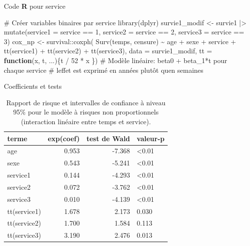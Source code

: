 \documentclass[
  ignorenonframetext,
]{beamer}
\newenvironment{Shaded}{\begin{snugshade}}{\end{snugshade}}
\newcommand{\AttributeTok}[1]{\textcolor[rgb]{0.40,0.45,0.13}{#1}}
\newcommand{\CommentTok}[1]{\textcolor[rgb]{0.37,0.37,0.37}{#1}}
\newcommand{\ControlFlowTok}[1]{\textcolor[rgb]{0.00,0.23,0.31}{\textbf{#1}}}
\newcommand{\DecValTok}[1]{\textcolor[rgb]{0.68,0.00,0.00}{#1}}
\newcommand{\FunctionTok}[1]{\textcolor[rgb]{0.28,0.35,0.67}{#1}}
\newcommand{\NormalTok}[1]{\textcolor[rgb]{0.00,0.23,0.31}{#1}}
\newcommand{\OtherTok}[1]{\textcolor[rgb]{0.00,0.23,0.31}{#1}}
\newcommand{\SpecialCharTok}[1]{\textcolor[rgb]{0.37,0.37,0.37}{#1}}
\begin{document}
\begin{frame}[fragile]{Code \textbf{R} pour service}
\protect{}\label{code-r-pour-service}
\begin{Shaded}
\begin{Highlighting}[numbers=left,,]
\CommentTok{\# Créer variables binaires par service}
\FunctionTok{library}\NormalTok{(dplyr)}
\NormalTok{survie1\_modif }\OtherTok{\textless{}{-}}\NormalTok{ survie1 }\SpecialCharTok{|\textgreater{}}
  \FunctionTok{mutate}\NormalTok{(}\AttributeTok{service1 =}\NormalTok{ service }\SpecialCharTok{==} \DecValTok{1}\NormalTok{,}
         \AttributeTok{service2 =}\NormalTok{ service }\SpecialCharTok{==} \DecValTok{2}\NormalTok{,}
         \AttributeTok{service3 =}\NormalTok{ service }\SpecialCharTok{==} \DecValTok{3}\NormalTok{)}
\NormalTok{cox\_np }\OtherTok{\textless{}{-}}\NormalTok{ survival}\SpecialCharTok{::}\FunctionTok{coxph}\NormalTok{(}
    \FunctionTok{Surv}\NormalTok{(temps, censure) }\SpecialCharTok{\textasciitilde{}} 
\NormalTok{     age }\SpecialCharTok{+}\NormalTok{ sexe }\SpecialCharTok{+}\NormalTok{ service }\SpecialCharTok{+} 
      \FunctionTok{tt}\NormalTok{(service1) }\SpecialCharTok{+} \FunctionTok{tt}\NormalTok{(service2) }\SpecialCharTok{+} \FunctionTok{tt}\NormalTok{(service3), }
     \AttributeTok{data =}\NormalTok{ survie1\_modif, }
     \AttributeTok{tt =} \ControlFlowTok{function}\NormalTok{(x, t, ...)\{t }\SpecialCharTok{/} \DecValTok{52} \SpecialCharTok{*}\NormalTok{ x \})}
\CommentTok{\# Modèle linéaire: beta0 + beta\_1*t pour chaque service}
\CommentTok{\# l\textquotesingle{}effet est exprimé en années plutôt qu\textquotesingle{}en semaines}
\end{Highlighting}
\end{Shaded}
\end{frame}

\begin{frame}{Coefficients et tests}
\protect{}\label{coefficients-et-tests}
\begin{longtable}[t]{lrrl}

\caption{\label{tbl-cox-nph}Rapport de risque et intervalles de
confiance à niveau 95\% pour le modèle à risques non proportionnels
(interaction linéaire entre temps et service).}

\tabularnewline

\toprule
terme & exp(coef) & test de Wald & valeur-p\\
\midrule
age & 0.953 & -7.368 & <0.01\\
sexe & 0.543 & -5.241 & <0.01\\
service1 & 0.144 & -4.293 & <0.01\\
service2 & 0.072 & -3.762 & <0.01\\
service3 & 0.010 & -4.139 & <0.01\\
\addlinespace
tt(service1) & 1.678 & 2.173 & 0.030\\
tt(service2) & 1.700 & 1.584 & 0.113\\
tt(service3) & 3.190 & 2.476 & 0.013\\
\bottomrule

\end{longtable}
\end{frame}
\end{document}
